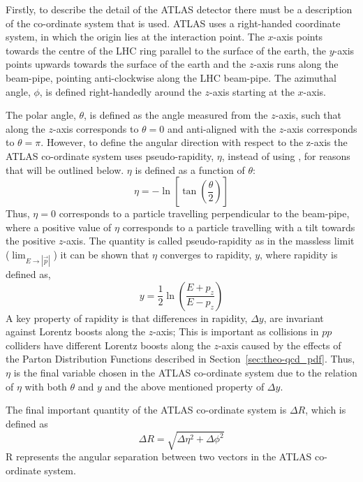 Firstly, to describe the detail of the ATLAS detector there must be a description of the co-ordinate system that is used.
ATLAS uses a right-handed coordinate system, in which the origin lies at the interaction point.
The $x$-axis points towards the centre of the LHC ring parallel to the surface of the earth,
the $y$-axis points upwards towards the surface of the earth
and the $z$-axis runs along the beam-pipe, pointing anti-clockwise along the LHC beam-pipe.
The azimuthal angle, $\phi$, is defined right-handedly around the $z$-axis starting at the $x$-axis.


The polar angle, $\theta$, is defined as the angle measured from the $z$-axis,
such that along the $z$-axis corresponds to $\theta = 0$
and anti-aligned with the $z$-axis corresponds to $\theta = \pi$.
However, to define the angular direction with respect to the z-axis the ATLAS co-ordinate system uses pseudo-rapidity, $\eta$, instead of using \theta, for reasons that will be outlined below.
$\eta$ is defined as a function of $\theta$:
\begin{equation}
 \eta = -\ln\left[\tan\left( \frac{\theta}{2} \right) \right]
\end{equation}
Thus, $\eta = 0$ corresponds to a particle travelling perpendicular to the beam-pipe,
where a positive value of $\eta$ corresponds to a particle travelling with a tilt towards the positive $z$-axis.
The quantity is called pseudo-rapidity as in the massless limit ($\lim_{E\to|\vec{p}|}$)
it can be shown that $\eta$ converges to rapidity, $y$, where rapidity is defined as,
\begin{equation}
  y = \frac{1}{2} \ln \left( \frac{E+p_{z}}{E-p_{z}} \right)
\end{equation}
A key property of rapidity is that differences in rapidity, $\Delta y$, are invariant against Lorentz boosts along the $z$-axis;
This is important as collisions in $pp$ colliders have different Lorentz boosts along the $z$-axis
caused by the effects of the Parton Distribution Functions described in Section~\ref{sec:theo-qcd_pdf}.
Thus, $\eta$ is the final variable chosen in the ATLAS co-ordinate system due to the relation of $\eta$ with both $\theta$ and $y$
and the above mentioned property of $\Delta y$.

\noindent
The final important quantity of the ATLAS co-ordinate system is $\Delta R$, which is defined as
\begin{equation}
  \Delta R = \sqrt{\Delta\eta^{2} + \Delta\phi^{2}}  \label{eqn:det-deltaR}
\end{equation}
\Delta R represents the angular separation between two vectors in the ATLAS co-ordinate system.


